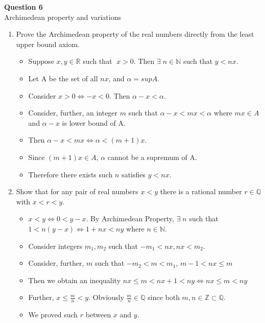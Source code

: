 \documentclass[12pt]{article}
\begin{document}
\newpage
\textbf{Question 6}\\
Archimedean property and variations
\begin{enumerate}[label=(\roman*)]
    \item Prove the Archimedean property of the real numbers directly from the least upper bound axiom.
        \begin{itemize}
            \item Suppose $x,y \in \mathbb{R}$ such that $\;x>0.$ Then $\exists\; n\in \mathbb{N}$ such that $y<nx$.
            \item Let A be the set of all $nx$, and $\alpha = supA$.
            \item Consider $x>0 \Leftrightarrow -x<0.$ Then $\alpha - x < \alpha$.
            \item Consider, further, an integer $m$ such that $\alpha - x < mx < \alpha$ where $mx \in A$ and $\alpha-x$ is lower bound of A.
            \item Then $\alpha - x < mx \Leftrightarrow \alpha < (m+1)x$. 
            \item Since $(m+1)x \in A$, $\alpha$ cannot be a supremum of A.
            \item Therefore there exists such $n$ satisfies $y<nx$.
        \end{itemize}
    
    \item Show that for any pair of real numbers $x < y$ there is a rational number $r \in \mathbb{Q}$ with $x < r< y$.
        \begin{itemize}
            \item $x<y \Leftrightarrow 0<y-x.$ By Archimedean Property, $\exists\; n$ such that\\ $1<n(y-x) \Leftrightarrow 1+nx < ny$ where $n \in \mathbb{N}$.
            \item Consider integers $m_1, m_2$ such that $-m_1 < nx, nx<m_2$.
            \item Consider, further, $m$ such that $-m_2 < m < m_1$, $m-1 < nx \le m$
            \item Then we obtain an inequality $nx \le m< nx+1 < ny \Leftrightarrow nx \le m < ny$
            \item Further, $x\le\frac{m}{n}<y$. Obviously $\frac{m}{n} \in \mathbb{Q}$ since both $m,n \in \mathbb{Z} \subset \mathbb{Q}.$
            \item We proved such $r$ between $x$ and $y$.
        \end{itemize}
    

\end{enumerate}
\end{document}
